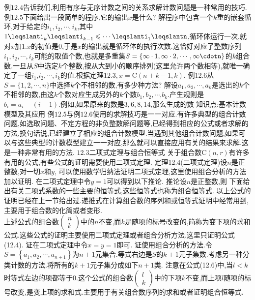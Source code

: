 例$12.4$告诉我们,利用有序与无序计数之间的关系求解计数问题是一种常用的技巧.
例$12.5$下面给出一段简单的程序,它的输出$x$是什么?
解程序中包含一个$k$重的嵌套循环,对于给定的$i_{1},i_{2},\cdots,i_{k}$,其中$1\leqslanti_{k}\leqslanti_{k-1}\leqslant\cdots\leqslanti_{1}\leqslantn$,循环体运行一次,就对$x$加$1.x$的初值是0,于是$x$的输出就是循环体的执行次数.这恰好对应了整数序列$i_{1},i_{2},\cdots,i_{k}$可能的取值个数,也就是多重集$S=\{\infty\cdot1,\infty\cdot2,\cdots,\infty\cdotn\}$的$k$组合数.一旦从$S$中选定$k$个整数,按从大到小的顺序排列(这里允许两个数相等),就唯一确定了一组$i_{1}$,$i_{2},\cdots,i_{k}$的值.根据定理$12.3,x=\mathrm{C}(n+k-1,k)$.
例$12.6$从$S=\{1,2,\cdots,n\}$中选择$k$个不相邻的数,有多少种方法?
解设$a_{1},a_{2},\cdots,a_{k}$是选出的$k$个不相邻的数,由这$k$个数对应生成另外的$k$个数$b_{1},b_{2},\cdots$,$b_{k}$.产生规则是$b_{i}=a_{i}-(i-1)$.例如,如果原来的数是$3,6,8,14$,那么生成的数
{知识点:基本计数模型及其应用}
例$12.5$与例$12.6$使用的求解技巧是一一对应.有许多典型的组合计数问题,如选取问题、不定方程的非负整数解问题等,已经得到相应的公式或者求解的方法,换句话说,已经建立了相应的组合计数模型.当遇到其他组合计数问题,如果可以与这些典型的计数模型建立一一对应,那么就可以直接应用有关的结果来求解.这是一种非常有用的方法.
{$12.3$二项式定理与组合恒等式}
关于组合数$\mathrm{C}(n,r)$有许多有用的公式,有些公式的证明需要使用二项式定理.
定理12.4(二项式定理)设$n$是正整数,对一切$x$和$y$,
可以使用数学归纳法证明二项式定理,这里使用组合分析的方法加以证明.
在二项式定理中令$y=1$可以得到以下推论.
推论设$n$是正整数,则
下面给出有关二项式系数的一些主要的恒等式,这些恒等式也称为组合恒等式.
以上公式的证明已经在上一节给出过.递推式在计算组合数的序列和或恒等式证明中经常用到,主要用于组合数的化简或者变形.\\
上述公式的组合数$\left(\begin{array}{l}n\\k\end{array}\right)$中的$n$不变,而$k$是随项的标号改变的,简称为变下项的求和公式.这些公式的证明主要使用二项式定理或者组合分析方法.这里只证明公式(12.4).
证在二项式定理中令$x=y=1$即可.
证使用组合分析的方法.令$S=\left\{a_{1},a_{2},\cdots,a_{n+1}\right\}$为$n+1$元集合.等式右边是$S$的$k+1$元子集数.考虑另一种分类计数的方法.将所有的$k+1$元子集分成如下$n+1$类.
注意在公式(12.6)中,当$l<k$时等式左边的项都等于0.这个公式的组合数$\left(\begin{array}{l}l\\k\end{array}\right)$中的下项$k$不变,而上项$l$随项的标号改变,是变上项的求和式.主要用于有关组合数序列的求和或者证明组合恒等式.
